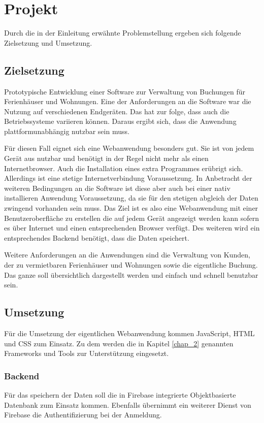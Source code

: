 \chapter{Projekt}
Durch die in der Einleitung erwähnte Problemstellung ergeben sich folgende Zielsetzung und Umsetzung.
\section{Zielsetzung}
Prototypische Entwicklung einer Software zur Verwaltung von Buchungen für Ferienhäuser und Wohnungen. Eine der Anforderungen an die Software war die Nutzung auf verschiedenen Endgeräten. Das hat zur folge, dass auch die Betriebssysteme variieren können. Daraus ergibt sich, dass die Anwendung plattformunabhängig nutzbar sein muss. 

Für diesen Fall eignet sich eine Webanwendung besonders gut. Sie ist von jedem Gerät aus nutzbar und benötigt in der Regel nicht mehr als einen Internetbrowser. Auch die Installation eines extra Programmes erübrigt sich. Allerdings ist eine stetige Internetverbindung Voraussetzung. In Anbetracht der weiteren Bedingungen an die Software ist diese aber auch bei einer nativ installieren Anwendung Voraussetzung, da sie für den stetigen abgleich der Daten zwingend vorhanden sein muss. Das Ziel ist es also eine Webanwendung mit einer Benutzeroberfläche zu erstellen die auf jedem Gerät angezeigt werden kann sofern es über Internet und einen entsprechenden Browser verfügt. Des weiteren wird ein entsprechendes Backend benötigt, dass die Daten speichert.

Weitere Anforderungen an die Anwendungen sind die Verwaltung von Kunden, der zu vermietbaren Ferienhäuser und Wohnungen sowie die eigentliche Buchung. Das ganze soll übersichtlich dargestellt werden und einfach und schnell benutzbar sein.


\section{Umsetzung}

Für die Umsetzung der eigentlichen Webanwendung kommen JavaScript, HTML und CSS zum Einsatz. Zu dem werden die in Kapitel \ref{chap_2} genannten Frameworks und Tools zur Unterstützung eingesetzt. 
\subsection{Backend}
Für das speichern der Daten soll die in Firebase integrierte Objektbasierte Datenbank zum Einsatz kommen. Ebenfalls übernimmt ein weiterer Dienst von Firebase die Authentifizierung bei der Anmeldung.

